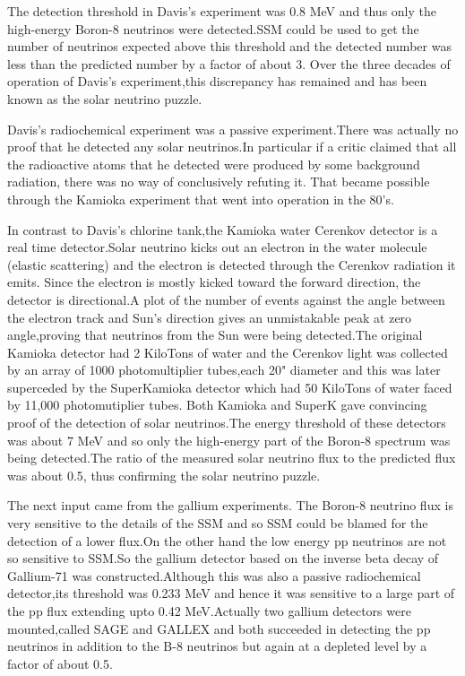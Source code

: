 The detection threshold in Davis's experiment was 0.8 MeV and
thus only the high-energy Boron-8 neutrinos were detected.SSM
could be used to get the number of neutrinos expected above
this threshold and the detected number was less than the
predicted number by a factor of about 3. Over the three decades
of operation of Davis's experiment,this discrepancy has
remained and has been known as the solar neutrino puzzle.

Davis's radiochemical experiment was a passive experiment.There
was actually no proof that he detected any solar neutrinos.In
particular if a critic claimed that all the radioactive atoms
that he detected were produced by some background radiation,
there was no way of conclusively refuting it. That became
possible through the Kamioka experiment that went into operation
in the 80's.

In contrast to Davis's chlorine tank,the Kamioka water Cerenkov
detector is a real time detector.Solar neutrino kicks out an
electron in the water molecule (elastic scattering) and the
electron is detected through the Cerenkov radiation it emits.
Since the electron is mostly kicked toward the forward direction,
the detector is directional.A plot of the number of events against
the angle between the electron track and Sun's direction gives
an unmistakable peak at zero angle,proving that neutrinos from
the Sun were being detected.The original Kamioka detector had
2 KiloTons of water and the Cerenkov light was collected by an
array of 1000 photomultiplier tubes,each 20" diameter and this
was later superceded by the SuperKamioka detector which had
50 KiloTons of water faced by 11,000 photomutiplier tubes.
Both Kamioka and SuperK gave convincing proof of the detection
of solar neutrinos.The energy threshold of these detectors
was about 7 MeV and so only the high-energy part of the Boron-8
spectrum was being detected.The ratio of the measured solar
neutrino flux to the predicted flux was about 0.5, thus
confirming the solar neutrino puzzle.

The next input came from the gallium experiments. The Boron-8
neutrino flux is very sensitive to the details of the SSM and
so SSM could be blamed for the detection of a lower flux.On the
other hand the low energy pp neutrinos are not so sensitive to
SSM.So the gallium detector based on the inverse beta decay of
Gallium-71 was constructed.Although this was also a passive
radiochemical detector,its threshold was 0.233 MeV and hence
it was sensitive to a large part of the pp flux extending upto
0.42 MeV.Actually two gallium detectors were mounted,called
SAGE and GALLEX and both succeeded in detecting the pp neutrinos
in addition to the B-8 neutrinos but again at a depleted level
by a factor of about 0.5.

